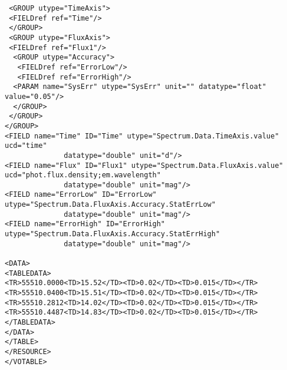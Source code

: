 {\begin{flushleft}
\begin{fmpage}
\begin{verbatim}
 <GROUP utype="TimeAxis">
 <FIELDref ref="Time"/>
 </GROUP>
 <GROUP utype="FluxAxis">
 <FIELDref ref="Flux1"/>
  <GROUP utype="Accuracy">
   <FIELDref ref="ErrorLow"/>
   <FIELDref ref="ErrorHigh"/>
  <PARAM name="SysErr" utype="SysErr" unit="" datatype="float" value="0.05"/>
  </GROUP>
 </GROUP>
</GROUP>
<FIELD name="Time" ID="Time" utype="Spectrum.Data.TimeAxis.value" ucd="time" 
              datatype="double" unit="d"/>   
<FIELD name="Flux" ID="Flux1" utype="Spectrum.Data.FluxAxis.value" ucd="phot.flux.density;em.wavelength" 
              datatype="double" unit="mag"/>
<FIELD name="ErrorLow" ID="ErrorLow" utype="Spectrum.Data.FluxAxis.Accuracy.StatErrLow" 
              datatype="double" unit="mag"/>
<FIELD name="ErrorHigh" ID="ErrorHigh" utype="Spectrum.Data.FluxAxis.Accuracy.StatErrHigh" 
              datatype="double" unit="mag"/>

<DATA>
<TABLEDATA>
<TR>55510.0000<TD>15.52</TD><TD>0.02</TD><TD>0.015</TD></TR>
<TR>55510.0400<TD>15.51</TD><TD>0.02</TD><TD>0.015</TD></TR>
<TR>55510.2812<TD>14.02</TD><TD>0.02</TD><TD>0.015</TD></TR>
<TR>55510.4487<TD>14.83</TD><TD>0.02</TD><TD>0.015</TD></TR>
</TABLEDATA>
</DATA>
</TABLE>
</RESOURCE>
</VOTABLE>

\end{verbatim}
\end{fmpage}

\end{flushleft}
}

